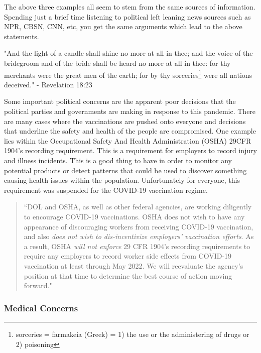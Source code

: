 \documentclass[10pt, a4paper, twocolumn]{book}
\begin{document}
The above three examples all seem to stem from the same sources of information. Spending just a brief time listening to political left leaning news sources such as NPR, CBSN, CNN, etc, you get the same arguments which lead to the above statements.

\begin{formal}
	"And the light of a candle shall shine no more at all in thee; and the voice of the bridegroom and of the bride shall be heard no more at all in thee: for thy merchants were the great men of the earth; for by thy sorceries\footnote{sorceries = farmakeia (Greek) = 1) the use or the administering of drugs or 2) poisoning} were all nations deceived." - Revelation 18:23 	
\end{formal}

Some important political concerns are the apparent poor decisions that the political parties and governments are making in response to this pandemic. There are many cases where the vaccinations are pushed onto everyone and decisions that underline the safety and health of the people are compromised. One example lies within the Occupational Safety And Health Administration (OSHA) 29CFR 1904's recording requirement. This is a requirement for employers to record injury and illness incidents. This is a good thing to have in order to monitor any potential products or detect patterns that could be used to discover something causing health issues within the population. Unfortunately for everyone, this requirement was suspended for the COVID-19 vaccination regime.

\begin{quotation}
	``DOL and OSHA, as well as other federal agencies, are working diligently to encourage COVID-19 vaccinations. OSHA does not wish to have any appearance of discouraging workers from receiving COVID-19 vaccination, and also \textit{does not wish to dis-incentivize employers' vaccination efforts}. As a result, OSHA \textit{will not enforce} 29 CFR 1904's recording requirements to require any employers to record worker side effects from COVID-19 vaccination at least through May 2022. We will reevaluate the agency’s position at that time to determine the best course of action moving forward." \citep{OSHAFAQ}
\end{quotation}







\subsubsection{Medical Concerns}
\end{document}
